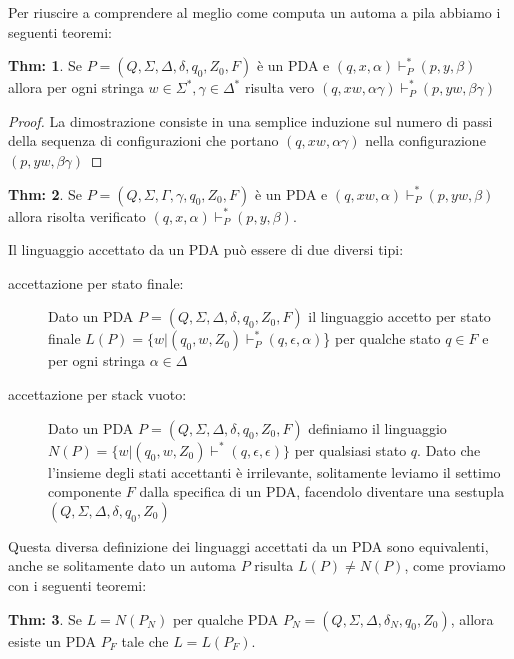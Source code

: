 \documentclass[a4paper]{book}
\theoremstyle{definition}%
\newtheorem{thm}{Thm:}[chapter]
\begin{document}
Per riuscire a comprendere al meglio come computa un automa a pila abbiamo i seguenti teoremi:
\begin{thm}
  Se $P = (Q, \Sigma, \Delta, \delta, q_0, Z_0, F)$  è un PDA e $(q, x, \alpha) \vdash ^*_P (p, y, \beta)$
  allora per ogni stringa $w \in \Sigma^*, \gamma \in \Delta^*$ risulta vero
  $(q, xw, \alpha \gamma) \vdash ^*_P (p, yw, \beta \gamma)$
\end{thm}
\begin{proof}
La dimostrazione consiste in una semplice induzione sul numero di passi della sequenza
di configurazioni che portano $(q, xw, \alpha \gamma)$ nella configurazione $(p, yw, \beta \gamma)$
\end{proof}
\begin{thm}
  Se $P = (Q, \Sigma, \Gamma, \gamma, q_0, Z_0, F)$ è un PDA e $(q, xw, \alpha) \vdash ^*_P (p, yw, \beta)$
  allora risolta verificato $(q, x, \alpha) \vdash ^*_P (p, y, \beta)$.
\end{thm}
Il linguaggio accettato da un PDA può essere di due diversi tipi:
\begin{description}
  \item [accettazione per stato finale:] Dato un PDA $P = (Q, \Sigma, \Delta, \delta, q_0, Z_0, F)$
         il linguaggio accetto per stato finale $L(P) = \{w | (q_0, w, Z_0) \vdash ^*_P (q, \epsilon, \alpha)$\}
         per qualche stato $q \in F$ e per ogni stringa $\alpha \in \Delta$

  \item [accettazione per stack vuoto:] Dato un PDA $P = (Q, \Sigma, \Delta, \delta, q_0, Z_0, F)$
        definiamo il linguaggio $N(P) = \{w | (q_0, w, Z_0) \vdash ^* (q, \epsilon, \epsilon)\}$
        per qualsiasi stato $q$.\newline
        Dato che l'insieme degli stati accettanti è irrilevante, solitamente leviamo il settimo componente $F$
        dalla specifica di un PDA, facendolo diventare una sestupla $(Q, \Sigma, \Delta, \delta, q_0, Z_0)$
\end{description}
Questa diversa definizione dei linguaggi accettati da un PDA sono equivalenti, anche se
solitamente dato un automa $P$ risulta $L(P) \neq N(P)$, come proviamo con i seguenti teoremi:
\begin{thm}
  Se $L = N(P_N)$ per qualche PDA $P_N = (Q, \Sigma, \Delta, \delta_N, q_0, Z_0)$,
  allora esiste un PDA $P_F$ tale che $L = L(P_F)$.
\end{thm}
\end{document}
